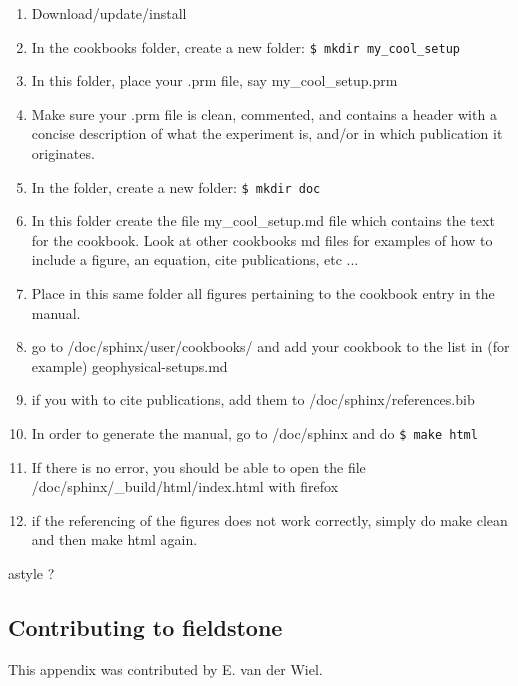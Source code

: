 \begin{enumerate}
\item Download/update/install \aspect 
\item In the cookbooks folder, create a new folder: \verb'$ mkdir my_cool_setup'
\item In this folder, place your .prm file, say my\_cool\_setup.prm
\item Make sure your .prm file is clean, commented, and contains a header with a concise
description of what the experiment is, and/or in which publication it originates.
\item In the folder, create a new folder:  \verb'$ mkdir doc'
\item In this folder create the file my\_cool\_setup.md file which contains the 
text for the cookbook. Look at other cookbooks md files for examples of how 
to include a figure, an equation, cite publications, etc ...
\item Place in this same folder all figures pertaining 
to the cookbook entry in the manual. 
\item go to /doc/sphinx/user/cookbooks/ and add your cookbook to the list in 
(for example) geophysical-setups.md
\item if you with to cite publications, add them to /doc/sphinx/references.bib
\item In order to generate the manual, go to /doc/sphinx and do \verb"$ make html"
\item If there is no error, you should be able to open the file /doc/sphinx/\_build/html/index.html
with firefox
\item if the referencing of the figures does not work correctly, simply do 
make clean and then make html again.
\end{enumerate}

astyle ?



\newpage
\subsection{Contributing to fieldstone}

\begin{mdframed}[backgroundcolor=red!5]
This appendix was contributed by E. van der Wiel.
\end{mdframed}


